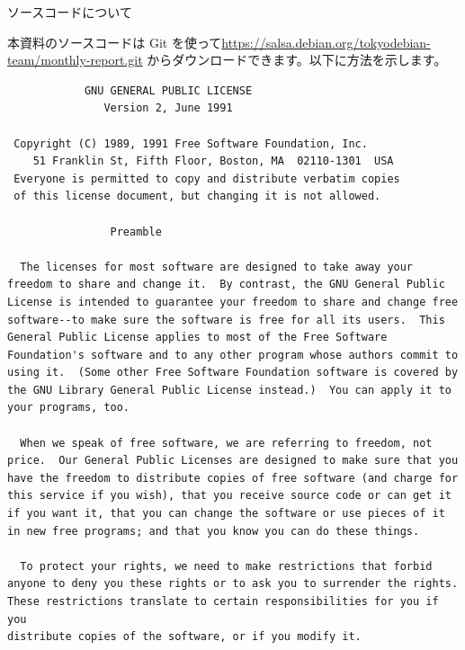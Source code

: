 \documentclass[mingoth,a4paper]{jsarticle}
\begin{document}
\begin{center}
ソースコードについて
\end{center}

本資料のソースコードは Git を使って\url{https://salsa.debian.org/tokyodebian-team/monthly-report.git}
からダウンロードできます。以下に方法を示します。


\begin{multicols}{2}
 \begin{fontsize}{6}{6}
 \begin{verbatim}
            GNU GENERAL PUBLIC LICENSE
               Version 2, June 1991

 Copyright (C) 1989, 1991 Free Software Foundation, Inc.
    51 Franklin St, Fifth Floor, Boston, MA  02110-1301  USA
 Everyone is permitted to copy and distribute verbatim copies
 of this license document, but changing it is not allowed.

                Preamble

  The licenses for most software are designed to take away your
freedom to share and change it.  By contrast, the GNU General Public
License is intended to guarantee your freedom to share and change free
software--to make sure the software is free for all its users.  This
General Public License applies to most of the Free Software
Foundation's software and to any other program whose authors commit to
using it.  (Some other Free Software Foundation software is covered by
the GNU Library General Public License instead.)  You can apply it to
your programs, too.

  When we speak of free software, we are referring to freedom, not
price.  Our General Public Licenses are designed to make sure that you
have the freedom to distribute copies of free software (and charge for
this service if you wish), that you receive source code or can get it
if you want it, that you can change the software or use pieces of it
in new free programs; and that you know you can do these things.

  To protect your rights, we need to make restrictions that forbid
anyone to deny you these rights or to ask you to surrender the rights.
These restrictions translate to certain responsibilities for you if you
distribute copies of the software, or if you modify it.


\end{verbatim}
\end{fontsize}
\end{multicols}
\end{document}
